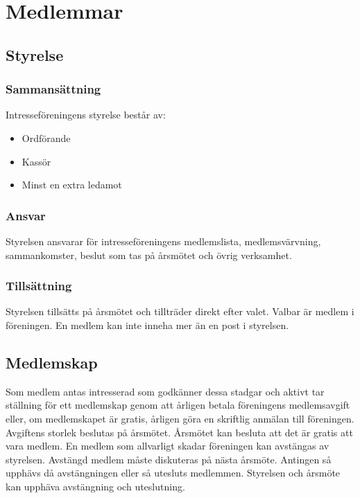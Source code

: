 \documentclass[11pt, noincludeaddress]{classes/cthit}
\begin{document}
\newpage

\section{Medlemmar}

\subsection{Styrelse}
\label{styrelse}

\subsubsection{Sammansättning}
Intresseföreningens styrelse består av:
\begin{itemize}
        \item Ordförande
		\item Kassör
		\item Minst en extra ledamot
\end{itemize}

\subsubsection{Ansvar}
Styrelsen ansvarar för intresseföreningens medlemslista,
medlemsvärvning, sammankomster, beslut som tas på årsmötet och övrig verksamhet.

\subsubsection{Tillsättning}
Styrelsen tillsätts på årsmötet och tillträder direkt efter valet. Valbar är medlem i föreningen. En medlem kan inte
inneha mer än en post i styrelsen.


\subsection{Medlemskap}
Som medlem antas intresserad som godkänner dessa stadgar och aktivt tar ställning för ett medlemskap genom
att årligen betala föreningens medlemsavgift eller, om medlemskapet är gratis, årligen göra en skriftlig anmälan
till föreningen. Avgiftens storlek beslutas på årsmötet. Årsmötet kan besluta att det är gratis att vara medlem. En medlem som allvarligt skadar föreningen kan avstängas av styrelsen. Avstängd medlem måste diskuteras på nästa
årsmöte. Antingen så upphävs då avstängningen eller så utesluts medlemmen. Styrelsen och årsmöte kan
upphäva avstängning och uteslutning.
\end{document}
